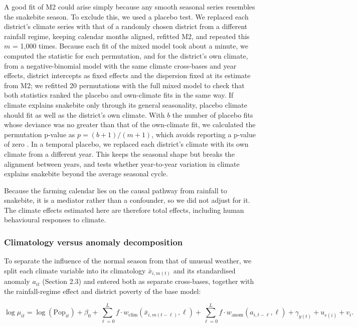 \documentclass[11pt,a4paper]{article}
\begin{document}
A good fit of M2 could arise simply because any smooth seasonal series resembles the snakebite season. To exclude this, we used a placebo test. We replaced each district's climate series with that of a randomly chosen district from a different rainfall regime, keeping calendar months aligned, refitted M2, and repeated this \(m\) = 1,000 times. Because each fit of the mixed model took about a minute, we computed the statistic for each permutation, and for the district's own climate, from a negative-binomial model with the same climate cross-bases and year effects, district intercepts as fixed effects and the dispersion fixed at its estimate from M2; we refitted 20 permutations with the full mixed model to check that both statistics ranked the placebo and own-climate fits in the same way. If climate explains snakebite only through its general seasonality, placebo climate should fit as well as the district's own climate. With \(b\) the number of placebo fits whose deviance was no greater than that of the own-climate fit, we calculated the permutation p-value as \(p = (b+1)/(m+1)\), which avoids reporting a p-value of zero \cite{ref41}. In a temporal placebo, we replaced each district's climate with its own climate from a different year. This keeps the seasonal shape but breaks the alignment between years, and tests whether year-to-year variation in climate explains snakebite beyond the average seasonal cycle.

Because the farming calendar lies on the causal pathway from rainfall to snakebite, it is a mediator rather than a confounder, so we did not adjust for it. The climate effects estimated here are therefore total effects, including human behavioural responses to climate.

\subsubsection{Climatology versus anomaly decomposition}

To separate the influence of the normal season from that of unusual weather, we split each climate variable into its climatology \(\bar{x}_{i,m(t)}\) and its standardised anomaly \(a_{it}\) (Section 2.3) and entered both as separate cross-bases, together with the rainfall-regime effect and district poverty of the base model:

\[\log \mu_{it} = \log(\text{Pop}_{it}) + \beta_0 + \sum_{\ell=0}^{L} f\cdot w_{\text{clim}}(\bar{x}_{i,m(t-\ell)},\ell) + \sum_{\ell=0}^{L} f\cdot w_{\text{anom}}(a_{i,t-\ell},\ell) + \gamma_{y(t)} + u_{r(i)} + v_i.\]
\end{document}
